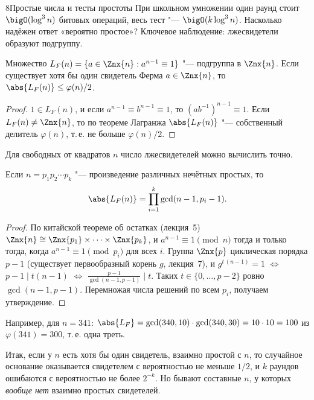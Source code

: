 \begin{lecture}{8}{Простые числа и тесты простоты}
При школьном умножении один раунд стоит $\bigO(\log^3 n)$ битовых операций, весь тест "---
$\bigO(k \log^3 n)$. Насколько надёжен ответ «вероятно простое»? Ключевое наблюдение:
лжесвидетели образуют подгруппу.

\begin{proposition}\label{l8:fermat-half}
Множество $L_F(n) = \{a \in \Znx{n} : a^{n-1} \equiv 1\}$ "--- подгруппа в $\Znx{n}$. Если
существует хотя бы один свидетель Ферма $a \in \Znx{n}$, то $\abs{L_F(n)} \le \varphi(n)/2$.
\end{proposition}

\begin{proof}
$1 \in L_F(n)$, и если $a^{n-1} \equiv b^{n-1} \equiv 1$, то $(ab^{-1})^{n-1} \equiv 1$.
Если $L_F(n) \ne \Znx{n}$, то по теореме Лагранжа $\abs{L_F(n)}$ "--- собственный делитель
$\varphi(n)$, т.\,е. не больше $\varphi(n)/2$.
\end{proof}

Для свободных от квадратов $n$ число лжесвидетелей можно вычислить точно.

\begin{proposition}\label{l8:fermat-count}
Если $n = p_1 p_2 \cdots p_k$ "--- произведение различных нечётных простых, то
\[
  \abs{L_F(n)} = \prod_{i=1}^{k} \gcd(n - 1, p_i - 1).
\]
\end{proposition}

\begin{proof}
По китайской теореме об остатках (лекция~5) $\Znx{n} \cong \Znx{p_1} \times \cdots \times \Znx{p_k}$,
и $a^{n-1} \equiv 1 \pmod n$ тогда и только тогда, когда $a^{n-1} \equiv 1 \pmod {p_i}$ для всех
$i$. Группа $\Znx{p}$ циклическая порядка $p - 1$ (существует первообразный корень $g$,
лекция~7), и $g^{t\,(n-1)} = 1$ $\iff$ $p - 1 \mid t(n - 1)$ $\iff$
$\frac{p - 1}{\gcd(n - 1, p - 1)} \mid t$. Таких $t \in \{0, \ldots, p - 2\}$ ровно
$\gcd(n - 1, p - 1)$. Перемножая числа решений по всем $p_i$, получаем утверждение.
\end{proof}

Например, для $n = 341$: $\abs{L_F} = \gcd(340, 10) \cdot \gcd(340, 30) = 10 \cdot 10 = 100$
из $\varphi(341) = 300$, т.\,е. одна треть.

Итак, если у $n$ есть хотя бы один свидетель, взаимно простой с $n$, то случайное основание
оказывается свидетелем с вероятностью не меньше $1/2$, и $k$ раундов ошибаются с вероятностью
не более $2^{-k}$. Но бывают составные $n$, у которых \emph{вообще нет} взаимно простых
свидетелей.


\end{lecture}
